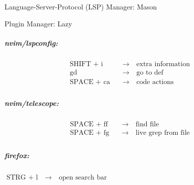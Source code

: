 Language-Server-Protocol (LSP) Manager: Mason

Plugin Manager: Lazy

\subparagraph*{nvim/lspconfig:}

\begin{align*}
\text{SHIFT + i}\quad&\longrightarrow\quad\text{extra information}\\
\text{gd}\quad&\longrightarrow\quad\text{go to def}\\
\text{SPACE + ca}\quad&\longrightarrow\quad\text{code actions}\\
\end{align*}

\subparagraph*{nvim/telescope:}

\begin{align*}
\text{SPACE + ff}\quad&\longrightarrow\quad\text{find file}\\
\text{SPACE + fg}\quad&\longrightarrow\quad\text{live grep from file}\\
\end{align*}

\subparagraph*{firefox:}
$\text{STRG + l}\quad\longrightarrow\quad\text{open search bar}$


